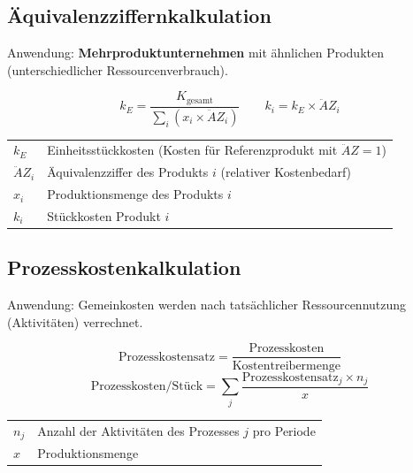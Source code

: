 \documentclass[10pt,a4paper]{article}
\begin{document}
\begin{multicols}{2}
\subsection{Äquivalenzziffernkalkulation}

Anwendung: \textbf{Mehrproduktunternehmen} mit ähnlichen Produkten (unterschiedlicher Ressourcenverbrauch).

\begin{formelbox}
\[
k_E = \frac{K_{\text{gesamt}}}{\sum_i (x_i \times \ddot{A}Z_i)}
\qquad
k_i = k_E \times \ddot{A}Z_i
\]
\end{formelbox}

\begin{tabular}{|L{2cm}|L{5cm}|}
\hline
{}
$k_E$ & Einheitsstückkosten (Kosten für Referenzprodukt mit $\ddot{A}Z=1$) \\
$\ddot{A}Z_i$ & Äquivalenzziffer des Produkts $i$ (relativer Kostenbedarf) \\
$x_i$ & Produktionsmenge des Produkts $i$ \\
$k_i$ & Stückkosten Produkt $i$ \\
\hline
\end{tabular}

\subsection{Prozesskostenkalkulation}

Anwendung: Gemeinkosten werden nach tatsächlicher Ressourcennutzung (Aktivitäten) verrechnet.

\begin{formelbox}
\[
\text{Prozesskostensatz} = \frac{\text{Prozesskosten}}{\text{Kostentreibermenge}}
\]
\[
\text{Prozesskosten/Stück} = \sum_j \frac{\text{Prozesskostensatz}_j \times n_j}{x}
\]
\end{formelbox}

\begin{tabular}{|L{2cm}|L{5cm}|}
\hline
$n_j$ & Anzahl der Aktivitäten des Prozesses $j$ pro Periode \\
$x$ & Produktionsmenge \\
\hline
\end{tabular}

\end{multicols}

\newpage

\end{document}
